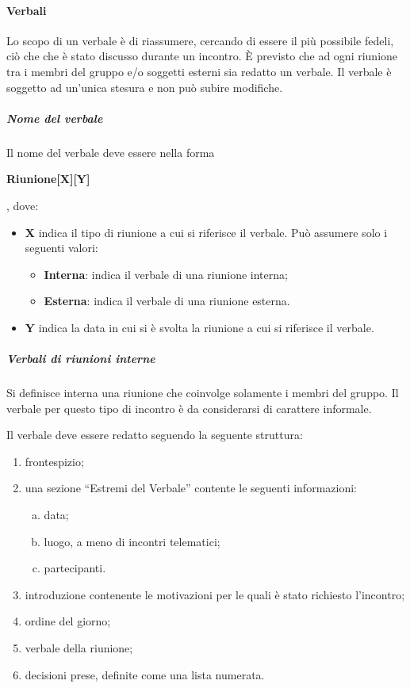 \documentclass[../NormeProgetto.text]{subfiles}
\begin{document}
		\paragraph{Verbali}
			Lo scopo di un verbale è di riassumere, cercando di essere il più possibile fedeli, ciò che che è stato discusso durante un incontro. È previsto che ad ogni riunione tra i membri del gruppo e/o soggetti esterni sia redatto un verbale. Il verbale è soggetto ad un'unica stesura e non può subire modifiche.
			\subparagraph{Nome del verbale}
				Il nome del verbale deve essere nella forma \begin{center}\textbf{Riunione[X][Y]}\end{center}, dove:
				\begin{itemize}
					\item \textbf{X} indica il tipo di riunione a cui si riferisce il verbale. Può assumere solo i seguenti valori:
					\begin{itemize}
						\item \textbf{Interna}: indica il verbale di una riunione interna;
						\item \textbf{Esterna}: indica il verbale di una riunione esterna.
					\end{itemize}
					\item \textbf{Y} indica la data in cui si è svolta la riunione a cui si riferisce il verbale.
				\end{itemize}
			\subparagraph{Verbali di riunioni interne}
				Si definisce interna una riunione che coinvolge solamente i membri del gruppo. Il verbale per questo tipo di incontro è da considerarsi di carattere informale. 
			
				Il verbale deve essere redatto seguendo la seguente struttura:
				\begin{enumerate}
					\item frontespizio;
					\item una sezione ``Estremi del Verbale'' contente le seguenti informazioni:
					\begin{enumerate}[a.]
						\item data;
						\item luogo, a meno di incontri telematici;
						\item partecipanti.
					\end{enumerate}
					\item introduzione contenente le motivazioni per le quali è stato richiesto l'incontro;
					\item ordine del giorno;
					\item verbale della riunione;
					\item decisioni prese, definite come una lista numerata.
				\end{enumerate}
			
\end{document}
